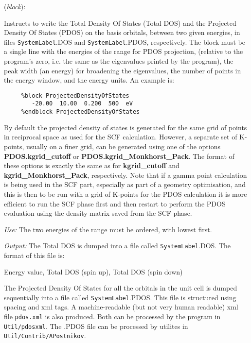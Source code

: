 \documentclass[11pt]{article}
\begin{document}
\begin{description}
\itemsep 10pt
\parsep 0pt
\item[{\bf ProjectedDensityOfStates}] ({\it block}):

Instructs to write the Total Density Of States (Total DOS) and the
Projected Density Of States (PDOS) on the basis orbitals,
between two given energies,
in files {\tt SystemLabel}.DOS and
{\tt SystemLabel}.PDOS, respectively.
The block must be a single line with the energies of the range for
PDOS projection,
(relative to the program's zero, i.e. the same as the eigenvalues
printed by the program), the peak width (an energy) for broadening
the eigenvalues, the number of points in the energy window,
and the energy units.
An example is:

\begin{verbatim}
     %block ProjectedDensityOfStates
        -20.00  10.00  0.200  500  eV
     %endblock ProjectedDensityOfStates
\end{verbatim}

By default the projected density of states is generated for the same
grid of points in reciprocal space as used for the SCF calculation.
However, a separate set of K-points, usually on a finer grid, can
be generated using one of the options \textbf{PDOS.kgrid\_cutoff} or
\textbf{PDOS.kgrid\_Monkhorst\_Pack}. The format of these options is
exactly the same as for \textbf{kgrid\_cutoff} and
\textbf{kgrid\_Monkhorst\_Pack}, respectively. Note that if a gamma
point calculation is being used in the SCF part, especially as part
of a geometry optimisation, and this is then to
be run with a grid of K-points for the PDOS calculation it is more
efficient to run the SCF phase first and then restart to perform the
PDOS evaluation using the density matrix saved from the SCF phase.

{\it Use:} The two energies of the range must be ordered, with lowest
first.

{\it Output:} The Total DOS is dumped into a file
called {\tt SystemLabel}.DOS. The format of this file is:

Energy value, Total DOS (spin up), Total DOS (spin down)

The Projected Density Of States for all the orbitals in the unit cell
is dumped sequentially into a file called {\tt SystemLabel}.PDOS. This
file is structured using spacing and xml tags. A machine-readable (but
not very human readable) xml file {\tt pdos.xml} is also
produced. Both can be processed by the program in {\tt
  Util/pdosxml}. The .PDOS file can be processed by utilites in {\tt
  Util/Contrib/APostnikov}.


\end{description}
\end{document}
